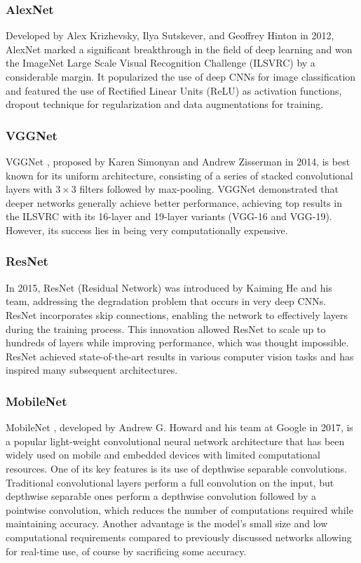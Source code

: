 \subsubsection{AlexNet}

Developed by Alex Krizhevsky, Ilya Sutskever, and Geoffrey Hinton in 2012,
AlexNet \cite{NIPS2012} marked a significant breakthrough in the field of deep
learning and won the ImageNet Large Scale Visual Recognition Challenge (ILSVRC)
by a considerable margin. It popularized the use of deep CNNs for image
classification and featured the use of Rectified Linear Units (ReLU) as
activation functions, dropout technique for regularization and data
augmentations for training.


\subsubsection{VGGNet}

VGGNet \cite{Simonyan2014}, proposed by Karen Simonyan and Andrew Zisserman in
2014, is best known for its uniform architecture, consisting of a series of
stacked convolutional layers with $3 \times 3$ filters followed by max-pooling.
VGGNet demonstrated that deeper networks generally achieve better performance,
achieving top results in the ILSVRC with its 16-layer and 19-layer variants
(VGG-16 and VGG-19). However, its success lies in being very computationally
expensive.


\subsubsection{ResNet}

In 2015, ResNet (Residual Network) \cite{He2015} was introduced by Kaiming He
and his team, addressing the degradation problem that occurs in very deep CNNs.
ResNet incorporates skip connections, enabling the network to effectively
 layers during the training process. This innovation allowed ResNet to
scale up to hundreds of layers while improving performance, which was thought
impossible.  ResNet achieved state-of-the-art results in various computer vision
tasks and has inspired many subsequent architectures.


\subsubsection{MobileNet}

MobileNet \cite{Howard2017}, developed by Andrew G. Howard and his team at
Google in 2017, is a popular light-weight convolutional neural network
architecture that has been widely used on mobile and embedded devices with
limited computational resources. One of its key features is its use of depthwise
separable convolutions. Traditional convolutional layers perform a full
convolution on the input, but depthwise separable ones perform a depthwise
convolution followed by a pointwise convolution, which reduces the number of
computations required while maintaining accuracy. Another advantage is the
model's small size and low computational requirements compared to previously
discussed networks allowing for real-time use, of course by sacrificing some
accuracy.


